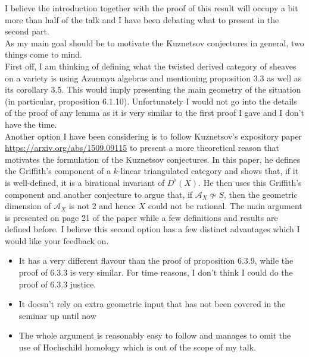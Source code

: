 I believe the introduction together with the proof of this result will occupy a bit more than half of the talk and I have been debating what to present in the second part.\\
As my main goal should be to motivate the Kuznetsov conjectures in general, two things come to mind.\\
First off, I am thinking of defining what the twisted derived category of sheaves on a variety is using Azumaya algebras and mentioning proposition 3.3 as well as its corollary 3.5.
This would imply presenting the main geometry of the situation (in particular, proposition 6.1.10).
Unfortunately I would not go into the details of the proof of any lemma as it is very similar to the first proof I gave and I don't have the time.\\
Another option I have been considering is to follow Kuznetsov's expository paper \url{https://arxiv.org/abs/1509.09115} to present a more theoretical reason that motivates the formulation of the Kuznetsov conjectures.
In this paper, he defines the Griffith's component of a $k$-linear triangulated category and shows that, if it is well-defined, it is a birational invariant of $D^{\flat}( X)$.
He then uses this Griffith's component and another conjecture to argue that, if $\mathcal{A}_X\not\simeq S$, then the geometric dimension of $\mathcal{A}_X$ is not 2 and hence $X$ could not be rational.
The main argument is presented on page 21 of the paper while a few definitions and results are defined before.
I believe this second option has a few distinct advantages which I would like your feedback on.
\begin{itemize}
\item It has a very different flavour than the proof of proposition 6.3.9, while the proof of 6.3.3 is very similar. For time reasons, I don't think I could do the proof of 6.3.3 justice.
\item It doesn't rely on extra geometric input that has not been covered in the seminar up until now
\item The whole argument is reasonably easy to follow and manages to omit the use of Hochschild homology which is out of the scope of my talk.
\end{itemize}





